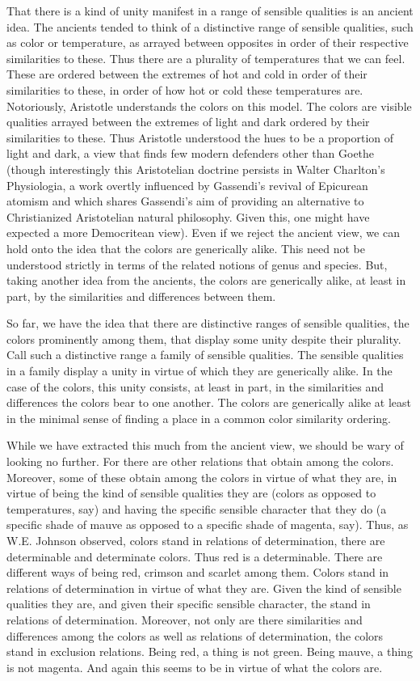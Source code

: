 \documentclass[12pt]{article}
\begin{document}
That there is a kind of unity manifest in a range of sensible qualities is an ancient idea. The ancients tended to think of a distinctive range of sensible qualities, such as color or temperature, as arrayed between opposites in order of their respective similarities to these. Thus there are a plurality of temperatures that we can feel. These are ordered between the extremes of hot and cold in order of their similarities to these, in order of how hot or cold these temperatures are. Notoriously, Aristotle understands the colors on this model. The colors are visible qualities arrayed between the extremes of light and dark ordered by their similarities to these. Thus Aristotle understood the hues to be a proportion of light and dark, a view that finds few modern defenders other than Goethe (though interestingly this Aristotelian doctrine persists in Walter Charlton's Physiologia, a work overtly influenced by Gassendi's revival of Epicurean atomism and which shares Gassendi's aim of providing an alternative to Christianized Aristotelian natural philosophy. Given this, one might have expected a more Democritean view). Even if we reject the ancient view, we can hold onto the idea that the colors are generically alike. This need not be understood strictly in terms of the related notions of genus and species. But, taking another idea from the ancients, the colors are generically alike, at least in part, by the similarities and differences between them.

So far, we have the idea that there are distinctive ranges of sensible qualities, the colors prominently among them, that display some unity despite their plurality. Call such a distinctive range a family of sensible qualities. The sensible qualities in a family display a unity in virtue of which they are generically alike. In the case of the colors, this unity consists, at least in part, in the similarities and differences the colors bear to one another. The colors are generically alike at least in the minimal sense of finding a place in a common color similarity ordering. 

While we have extracted this much from the ancient view, we should be wary of looking no further. For there are other relations that obtain among the colors. Moreover, some of these obtain among the colors in virtue of what they are, in virtue of being the kind of sensible qualities they are (colors as opposed to temperatures, say) and having the specific sensible character that they do (a specific shade of mauve as opposed to a specific shade of magenta, say). Thus, as W.E. Johnson observed, colors stand in relations of determination, there are determinable and determinate colors. Thus red is a determinable. There are different ways of being red, crimson and scarlet among them. Colors stand in relations of determination in virtue of what they are. Given the kind of sensible qualities they are, and given their specific sensible character, the stand in relations of determination. Moreover, not only are there similarities and differences among the colors as well as relations of determination, the colors stand in exclusion relations. Being red, a thing is not green. Being mauve, a thing is not magenta. And again this seems to be in virtue of what the colors are. 
\end{document}
